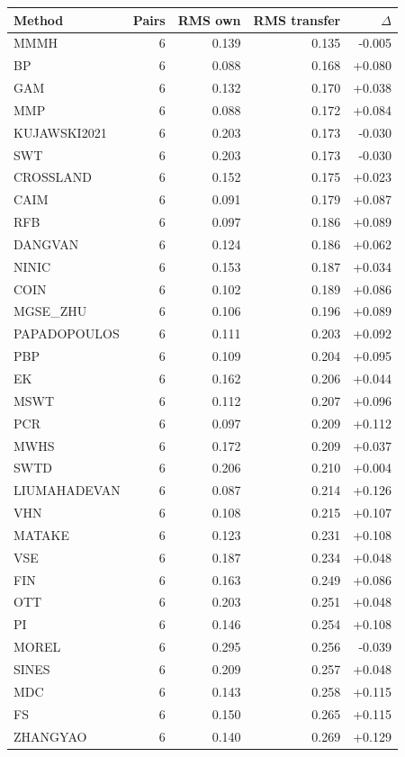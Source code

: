 \begin{tabular}{lrrrr}
\hline
Method & Pairs & RMS own & RMS transfer & $\Delta$ \\
\hline
MMMH & 6 & 0.139 & 0.135 & -0.005 \\
BP & 6 & 0.088 & 0.168 & +0.080 \\
GAM & 6 & 0.132 & 0.170 & +0.038 \\
MMP & 6 & 0.088 & 0.172 & +0.084 \\
KUJAWSKI2021 & 6 & 0.203 & 0.173 & -0.030 \\
SWT & 6 & 0.203 & 0.173 & -0.030 \\
CROSSLAND & 6 & 0.152 & 0.175 & +0.023 \\
CAIM & 6 & 0.091 & 0.179 & +0.087 \\
RFB & 6 & 0.097 & 0.186 & +0.089 \\
DANGVAN & 6 & 0.124 & 0.186 & +0.062 \\
NINIC & 6 & 0.153 & 0.187 & +0.034 \\
COIN & 6 & 0.102 & 0.189 & +0.086 \\
MGSE_ZHU & 6 & 0.106 & 0.196 & +0.089 \\
PAPADOPOULOS & 6 & 0.111 & 0.203 & +0.092 \\
PBP & 6 & 0.109 & 0.204 & +0.095 \\
EK & 6 & 0.162 & 0.206 & +0.044 \\
MSWT & 6 & 0.112 & 0.207 & +0.096 \\
PCR & 6 & 0.097 & 0.209 & +0.112 \\
MWHS & 6 & 0.172 & 0.209 & +0.037 \\
SWTD & 6 & 0.206 & 0.210 & +0.004 \\
LIUMAHADEVAN & 6 & 0.087 & 0.214 & +0.126 \\
VHN & 6 & 0.108 & 0.215 & +0.107 \\
MATAKE & 6 & 0.123 & 0.231 & +0.108 \\
VSE & 6 & 0.187 & 0.234 & +0.048 \\
FIN & 6 & 0.163 & 0.249 & +0.086 \\
OTT & 6 & 0.203 & 0.251 & +0.048 \\
PI & 6 & 0.146 & 0.254 & +0.108 \\
MOREL & 6 & 0.295 & 0.256 & -0.039 \\
SINES & 6 & 0.209 & 0.257 & +0.048 \\
MDC & 6 & 0.143 & 0.258 & +0.115 \\
FS & 6 & 0.150 & 0.265 & +0.115 \\
ZHANGYAO & 6 & 0.140 & 0.269 & +0.129 \\

\end{tabular}
